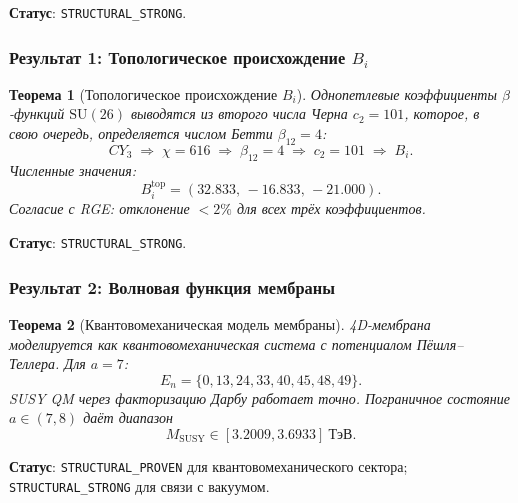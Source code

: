 \documentclass[11pt,a4paper]{article}
\newcommand{\SU}{\ensuremath{\mathrm{SU}}}
\newcommand{\CY}{\ensuremath{CY_3}}
\newtheorem{theorem}{Теорема}[section]
\theoremstyle{definition}
\begin{document}
\medskip\noindent
\textbf{Статус}: \texttt{STRUCTURAL\_STRONG}.

\subsubsection{Результат 1: Топологическое происхождение \texorpdfstring{$B_i$}{B\_i}}

\begin{theorem}[Топологическое происхождение $B_i$]
\label{thm:conclusion-bi}
Однопетлевые коэффициенты $\beta$-функций $\SU(26)$
выводятся из второго числа Черна $c_2 = 101$, которое,
в свою очередь, определяется числом Бетти $\beta_{12} = 4$:
\begin{equation}
    \CY \;\Rightarrow\; \chi = 616
    \;\Rightarrow\; \beta_{12} = 4
    \;\Rightarrow\; c_2 = 101
    \;\Rightarrow\; B_i.
    \label{eq:conclusion-chain-bi}
\end{equation}
Численные значения:
\begin{equation}
    \boxed{
    B_i^{\text{top}} = (32.833, \, -16.833, \, -21.000).
    }
    \label{eq:conclusion-bi-values}
\end{equation}
Согласие с RGE: отклонение $< 2\%$ для всех трёх коэффициентов.
\end{theorem}

\medskip\noindent
\textbf{Статус}: \texttt{STRUCTURAL\_STRONG}.

\subsubsection{Результат 2: Волновая функция мембраны}

\begin{theorem}[Квантовомеханическая модель мембраны]
\label{thm:conclusion-membrane}
4D-мембрана моделируется как квантовомеханическая система
с потенциалом Пёшля--Теллера. Для $a = 7$:
\begin{equation}
    \boxed{
    E_n = \{0, 13, 24, 33, 40, 45, 48, 49\}.
    }
\end{equation}
SUSY QM через факторизацию Дарбу работает точно.
Пограничное состояние $a \in (7, 8)$ даёт диапазон
\begin{equation}
    \boxed{
    M_{\text{SUSY}} \in [3.2009, 3.6933]~\text{ТэВ}.
    }
\end{equation}
\end{theorem}

\medskip\noindent
\textbf{Статус}: \texttt{STRUCTURAL\_PROVEN} для
квантовомеханического сектора; \texttt{STRUCTURAL\_STRONG}
для связи с вакуумом.
\end{document}
